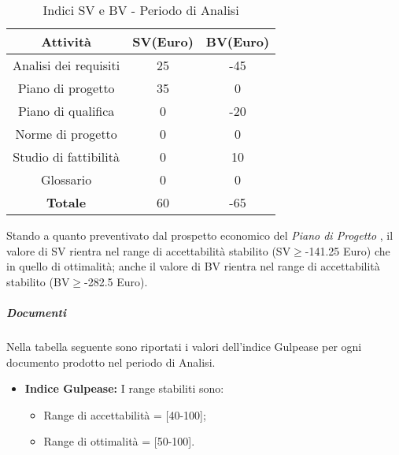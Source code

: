       \begin{table}[H]
        \centering
        \begin{tabular}{|c|c|c|}
          \hline
          \textbf{Attività} & \textbf{SV}(Euro)  & \textbf{BV}(Euro) \\
          \hline
          Analisi dei requisiti  & 25 & -45  \\
          Piano di progetto & 35  & 0\\
          Piano di qualifica  & 0  & -20\\
          Norme di progetto & 0  & 0 \\
          Studio di fattibilità & 0  & 10  \\
          Glossario & 0  & 0  \\
          \hline
          \textbf{Totale} & 60  & -65  \\
          \hline
        \end{tabular}
        \caption{Indici SV e BV - Periodo di Analisi}
      \end{table}
      Stando a quanto preventivato dal prospetto economico del \emph{Piano di Progetto \VersionePP{}}, il valore di SV rientra nel range di accettabilità stabilito (SV\(\geq\)-141.25 Euro) che in quello di ottimalità;
      anche il valore di BV rientra nel range di accettabilità stabilito (BV\(\geq\)-282.5 Euro).
      
      \subparagraph{Documenti}
      Nella tabella seguente sono riportati i valori dell'indice Gulpease per ogni documento prodotto nel periodo di Analisi.\\

\begin{itemize}
\item \textbf{Indice Gulpease: }I range stabiliti sono:
      \begin{itemize}
        \item Range di accettabilità = [40-100];
        \item Range di ottimalità = [50-100].
      \end{itemize}
\end{itemize}      
      
